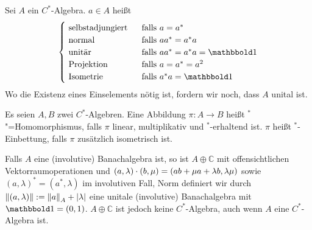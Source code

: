 \begin{definition}
	Sei $A$ ein $C^*$-Algebra. $a \in A$ heißt 
	\[
		\begin{cases}
			\text{ selbstadjungiert }  &\text{ falls } a=a^*\\
			\text{ normal }  &\text{ falls }  aa^*=a^*a \\
			\text{ unitär }  &\text{ falls }  aa^*=a^*a=\ind \\
			\text{ Projektion }  &\text{ falls }   a=a^*=a^2 \\
			\text{ Isometrie }  &\text{ falls } a^*a= \ind  
		\end{cases}
	\]
	Wo die Existenz eines Einselements nötig ist, fordern wir noch, dass $A$ unital ist.
\end{definition}

\begin{definition}
	Es seien $A,B$ zwei $C^*$-Algebren. Eine Abbildung $\pi \colon A \to B$ heißt ${}^*$"=Homomorphismus, falls $\pi$ linear, multiplikativ und ${}^*$-erhaltend ist. $\pi$ heißt
	${}^*$-Einbettung, falls $\pi$ zusätzlich isometrisch ist. 
\end{definition}

\begin{bemerkung}
	Falls $A$ eine (involutive) Banachalgebra ist, so ist $A \oplus \mathbb{C}$ mit offensichtlichen Vektorraumoperationen und 
	$(a,\lambda) \cdot (b,\mu) = \enbrace*{ab + \mu a + \lambda b, \lambda \mu}$ sowie $(a,\lambda)^* = (a^*,\lambda)$ im involutiven Fall,  Norm definiert wir durch
	$\norm{(a,\lambda)}:= \norm{a}_{A} + \abs{\lambda}$ eine unitale (involutive) Banachalgebra mit $\ind=(0,1)$. $A \oplus \mathbb{C}$ ist jedoch keine $C^*$-Algebra, auch wenn
	$A$ eine $C^*$-Algebra ist.
\end{bemerkung}

